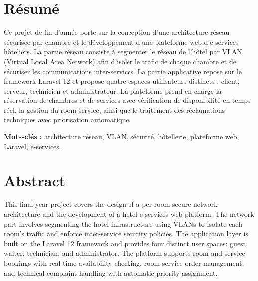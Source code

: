 \documentclass[12pt,a4paper]{report}
\begin{document}
\clearpage


\chapter*{Résumé}

Ce projet de fin d'année porte sur la conception d'une architecture réseau
sécurisée par chambre et le développement d'une plateforme web d'e-services
hôteliers. La partie réseau consiste à segmenter le réseau de l'hôtel par
VLAN (Virtual Local Area Network) afin d'isoler le trafic de chaque chambre
et de sécuriser les communications inter-services. La partie applicative
repose sur le framework Laravel 12 et propose quatre espaces utilisateurs
distincts : client, serveur, technicien et administrateur. La plateforme
prend en charge la réservation de chambres et de services avec vérification
de disponibilité en temps réel, la gestion du room service, ainsi que le
traitement des réclamations techniques avec priorisation automatique.

\vspace{0.5cm}

\noindent\textbf{Mots-clés :} architecture réseau, VLAN, sécurité, hôtellerie,
plateforme web, Laravel, e-services.

\clearpage


\chapter*{Abstract}

This final-year project covers the design of a per-room secure network
architecture and the development of a hotel e-services web platform. The
network part involves segmenting the hotel infrastructure using VLANs to
isolate each room's traffic and enforce inter-service security policies. The
application layer is built on the Laravel 12 framework and provides four
distinct user spaces: guest, waiter, technician, and administrator. The
platform supports room and service bookings with real-time availability
checking, room-service order management, and technical complaint handling
with automatic priority assignment.

\vspace{0.5cm}
\end{document}
